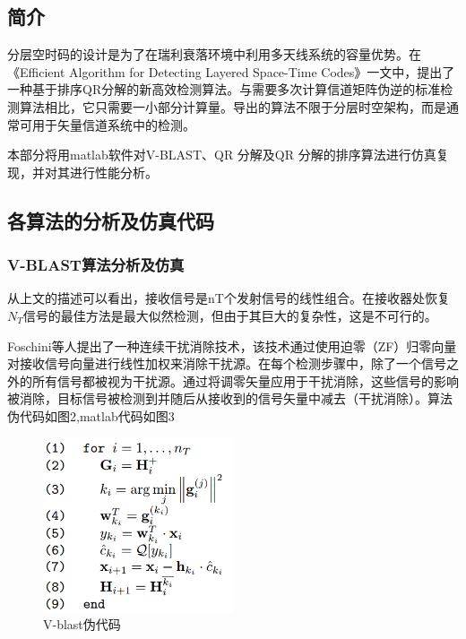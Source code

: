 \documentclass[a4paper,12pt]{article}
\begin{document}
	\subsection{简介}
	分层空时码的设计是为了在瑞利衰落环境中利用多天线系统的容量优势。在《Efficient Algorithm for Detecting Layered
	Space-Time Codes》一文中，提出了一种基于排序QR分解的新高效检测算法。与需要多次计算信道矩阵伪逆的标准检测算法相比，它只需要一小部分计算量。导出的算法不限于分层时空架构，而是通常可用于矢量信道系统中的检测。\par 
	本部分将用matlab软件对V-BLAST、QR 分解及QR 分解的排序算法进行仿真复现，并对其进行性能分析。
	\subsection{各算法的分析及仿真代码}
	\subsubsection{V-BLAST算法分析及仿真}
	从上文的描述可以看出，接收信号是nT个发射信号的线性组合。在接收器处恢复$N_T$信号的最佳方法是最大似然检测，但由于其巨大的复杂性，这是不可行的。\par 
	Foschini等人提出了一种连续干扰消除技术，该技术通过使用迫零（ZF）归零向量对接收信号向量进行线性加权来消除干扰源。在每个检测步骤中，除了一个信号之外的所有信号都被视为干扰源。通过将调零矢量应用于干扰消除，这些信号的影响被消除，目标信号被检测到并随后从接收到的信号矢量中减去（干扰消除）。算法伪代码如图2,matlab代码如图3
	\begin{figure}[h]
		\centering
		\includegraphics[width=0.5\textwidth]{2.png}
		\caption{V-blast伪代码}
	\end{figure}
\end{document}
